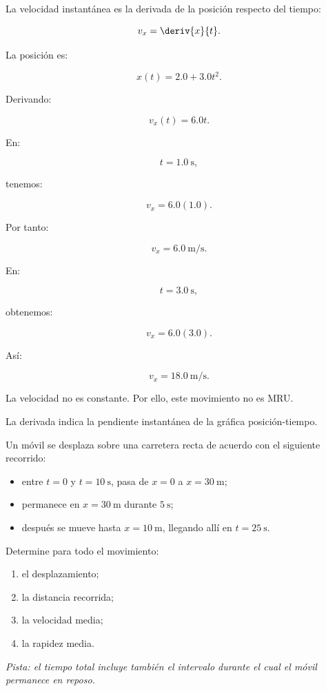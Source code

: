 \begin{explicacion}
La velocidad instantánea es la derivada de la posición respecto del tiempo:

\[ v_x=\deriv{x}{t}. \]

La posición es:

\[ x(t)=2.0+3.0t^2. \]

Derivando:

\[ v_x(t)=6.0t. \]

En:

\[ t=\SI{1.0}{\second}, \]

tenemos:

\[
v_x=6.0(1.0).
\]

Por tanto:

\[ \boxed{v_x=\SI{6.0}{\meter\per\second}}. \]

En:

\[ t=\SI{3.0}{\second}, \]

obtenemos:

\[
v_x=6.0(3.0).
\]

Así:

\[ \boxed{v_x=\SI{18.0}{\meter\per\second}}. \]

La velocidad no es constante. Por ello, este movimiento no es MRU.

La derivada indica la pendiente instantánea de la gráfica posición-tiempo.
\end{explicacion}


\nivelintermedio


\begin{ejercicio}
Un móvil se desplaza sobre una carretera recta de acuerdo con el siguiente recorrido:

\begin{itemize}
    \item entre \(t=0\) y \(t=\SI{10}{\second}\), pasa de \(x=0\) a \(x=\SI{30}{\meter}\);
    \item permanece en \(x=\SI{30}{\meter}\) durante \(\SI{5}{\second}\);
    \item después se mueve hasta \(x=\SI{10}{\meter}\), llegando allí en \(t=\SI{25}{\second}\).
\end{itemize}

Determine para todo el movimiento:

\begin{enumerate}[label=\alph*)]
    \item el desplazamiento;
    \item la distancia recorrida;
    \item la velocidad media;
    \item la rapidez media.
\end{enumerate}

\textit{Pista: el tiempo total incluye también el intervalo durante el cual el móvil permanece en reposo.}
\end{ejercicio}

